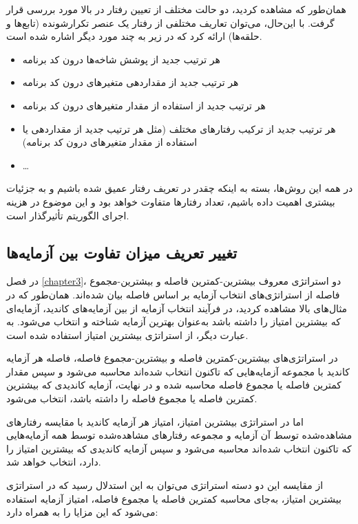 همان‌طور که مشاهده کردید، دو حالت مختلف از تعیین رفتار در بالا مورد بررسی قرار گرفت. با این‌حال، می‌توان تعاریف مختلفی از رفتار یک عنصر تکرارشونده (تابع‌ها و حلقه‌ها) ارائه کرد که در زیر به چند مورد دیگر اشاره شده است.
\begin{itemize}
	\item هر ترتیب جدید از پوشش شاخه‌ها  درون کد برنامه
	\item هر ترتیب جدید از مقداردهی متغیرهای درون کد برنامه
	\item هر ترتیب جدید از استفاده از مقدار متغیرهای درون کد برنامه
	\item هر ترتیب جدید از ترکیب رفتارهای مختلف (مثل هر ترتیب جدید از مقداردهی یا استفاده از مقدار متغیرهای درون کد برنامه)
	\item \dots
\end{itemize}
در همه این روش‌ها، بسته به اینکه چقدر در تعریف رفتار عمیق شده باشیم و به جزئیات بیشتری اهمیت داده باشیم، تعداد رفتارها متفاوت خواهد بود و این موضوع در هزینه اجرای الگوریتم تأثیرگذار است.

\subsection{تغییر تعریف میزان تفاوت بین آزمایه‌ها}

در فصل \ref{chapter3}، دو استراتژی معروف بیشترین-کمترین فاصله و بیشترین-مجموع فاصله از استراتژی‌های انتخاب آزمایه بر اساس فاصله بیان شده‌اند. همان‌طور که در مثال‌های بالا مشاهده کردید، در فرآیند انتخاب آزمایه از بین آزمایه‌های کاندید، آزمایه‌ای که بیشترین امتیاز را داشته باشد به‌عنوان بهترین آزمایه شناخته و انتخاب می‌شود. به عبارت دیگر، از استراتژی بیشترین امتیاز استفاده شده است.

در استراتژی‌های بیشترین-کمترین فاصله و بیشترین-مجموع فاصله، فاصله هر آزمایه کاندید با مجموعه آزمایه‌هایی که تاکنون انتخاب شده‌اند محاسبه می‌شود و سپس مقدار کمترین فاصله یا مجموع فاصله محاسبه شده و در نهایت، آزمایه‌ کاندیدی که بیشترین کمترین فاصله یا مجموع فاصله را داشته باشد، انتخاب می‌شود.

اما در استراتژی بیشترین امتیاز، امتیاز هر آزمایه کاندید با مقایسه رفتارهای مشاهده‌شده توسط آن آزمایه و مجموعه رفتارهای مشاهده‌شده توسط همه آزمایه‌هایی که تاکنون انتخاب شده‌اند محاسبه می‌شود و سپس آزمایه کاندیدی که بیشترین امتیاز را دارد، انتخاب خواهد شد.

از مقایسه این دو دسته استراتژی می‌توان به این استدلال رسید که در استراتژی بیشترین امتیاز، به‌جای محاسبه کمترین فاصله یا مجموع فاصله، امتیاز آزمایه استفاده می‌شود که این مزایا را به همراه دارد:

